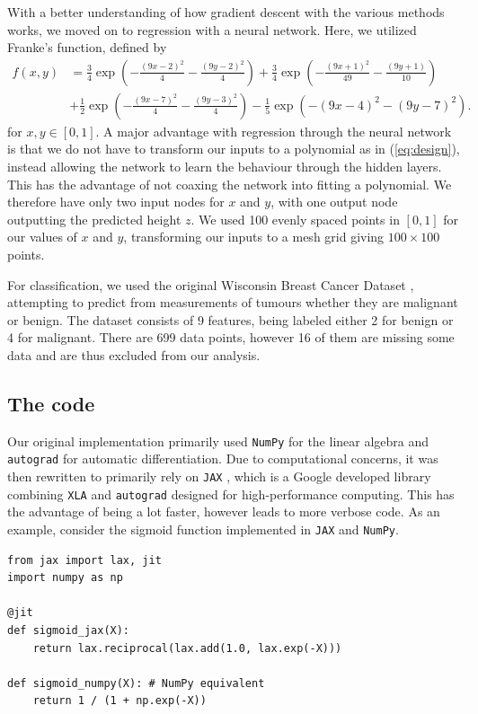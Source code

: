 \documentclass{article}
\theoremstyle{definition}
\begin{document}
With a better understanding of how gradient descent with the various methods works, we moved on to regression with a neural network. Here, we utilized Franke's function, defined by
\begin{equation*}
    \begin{split}
        f(x,y) & = \frac{3}{4}\exp\left(-\frac{(9x-2)^2}{4} - \frac{(9y-2)^2}{4}\right) + \frac{3}{4}\exp\left(-\frac{(9x+1)^2}{49} - \frac{(9y+1)}{10}\right) \\
        & + \frac{1}{2}\exp\left(-\frac{(9x-7)^2}{4} - \frac{(9y-3)^2}{4}\right) - \frac{1}{5}\exp\left(-(9x-4)^2 - (9y-7)^2\right).
    \end{split}
\end{equation*}
for $x,y \in [0,1]$. A major advantage with regression through the neural network is that we do not have to transform our inputs to a polynomial as in (\ref{eq:design}), instead allowing the network to learn the behaviour through the hidden layers. This has the advantage of not coaxing the network into fitting a polynomial. We therefore have only two input nodes for $x$ and $y$, with one output node outputting the predicted height $z$. We used 100 evenly spaced points in $[0,1]$ for our values of $x$ and $y$, transforming our inputs to a mesh grid giving $100 \times 100$ points.

For classification, we used the original Wisconsin Breast Cancer Dataset \parencite{breastcancerwisonsin}, attempting to predict from measurements of tumours whether they are malignant or benign. The dataset consists of 9 features, being labeled either 2 for benign or 4 for malignant. There are 699 data points, however 16 of them are missing some data and are thus excluded from our analysis.

\subsection{The code}
Our original implementation primarily used \verb|NumPy| for the linear algebra and \verb|autograd| for automatic differentiation. Due to computational concerns, it was then rewritten to primarily rely on \verb|JAX| \parencite{jax2018github}, which is a Google developed library combining \verb|XLA| and \verb|autograd| designed for high-performance computing. This has the advantage of being a lot faster, however leads to more verbose code. As an example, consider the sigmoid function implemented in \verb|JAX| and \verb|NumPy|.

\begin{verbatim}
from jax import lax, jit
import numpy as np

@jit
def sigmoid_jax(X):
    return lax.reciprocal(lax.add(1.0, lax.exp(-X)))

def sigmoid_numpy(X): # NumPy equivalent
    return 1 / (1 + np.exp(-X))
\end{verbatim}
\end{document}
